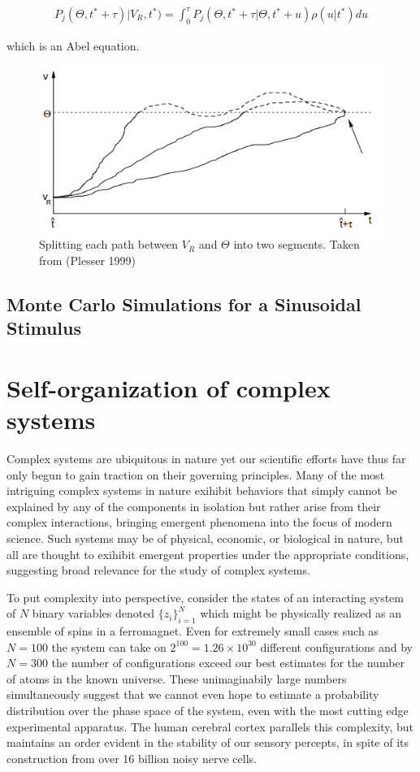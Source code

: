 \documentclass{ucetd}
\begin{document}
\begin{align*}
P_{j}(\Theta, t^{*}+\tau)|V_{R},t^{*}) = \int_{0}^{\tau} P_{j}(\Theta, t^{*}+\tau | \Theta, t^{*}+u)\rho(u|t^{*})du 
\end{align*}

which is an Abel equation.

\begin{figure}
\centering
\includegraphics[width=125mm]{fig_6-A}
\caption{Splitting each path between $V_{R}$ and $\Theta$ into two segments. Taken from (Plesser 1999)}
\end{figure}

\section{Monte Carlo Simulations for a Sinusoidal Stimulus}

\chapter{Self-organization of complex systems}

Complex systems are ubiquitous in nature yet our scientific efforts have thus far only begun to gain traction on their governing principles. Many of the most intriguing complex systems in nature exihibit behaviors that simply cannot be explained by any of the components in isolation but rather arise from their complex interactions, bringing emergent phenomena into the focus of modern science. Such systems may be of physical, economic, or biological in nature, but all are thought to exihibit emergent properties under the appropriate conditions, suggesting broad relevance for the study of complex systems. 

To put complexity into perspective, consider the states of an interacting system of $N$ binary variables denoted $\{z_{i}\}_{i=1}^{N}$ which might be physically realized as an ensemble of spins in a ferromagnet. Even for extremely small cases such as $N=100$ the system can take on $2^{100} = 1.26\times 10^{30}$ different configurations and by $N=300$ the number of configurations exceed our best estimates for the number of atoms in the known universe. These unimaginabily large numbers simultaneously suggest that we cannot even hope to estimate a probability distribution over the phase space of the system, even with the most cutting edge experimental apparatus. The human cerebral cortex parallels this complexity, but maintains an order evident in the stability of our sensory percepts, in spite of its construction from over 16 billion noisy nerve cells. 
\end{document}
